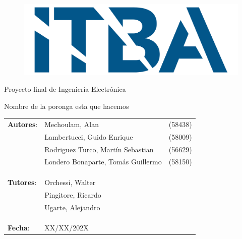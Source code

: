 \begin{titlepage}
\begin{figure}[H]
	\centering
	\includegraphics[width=0.5\linewidth]{./Utils/ITBA_2}
\end{figure}

\vspace*{1.5cm}

\center
{\Huge Proyecto final de Ingeniería Electrónica }

\vspace*{1cm}

{\LARGE \textcolor{PName}{Nombre de la poronga esta que hacemos} }

\vspace*{3cm}

\begin{tabular}{llr} 	
\textbf{Autores}: & Mechoulam, Alan  &  (58438)\\
 & Lambertucci, Guido Enrique  & (58009) \\
 & Rodriguez Turco, Martín Sebastian  & (56629) \\
 & Londero Bonaparte, Tomás Guillermo  & (58150) \\
 &  & \\
 &  & \\
 &  & \\
\textbf{Tutores}: & Orchessi, Walter & \hspace*{4cm} \\
 & Pingitore, Ricardo & \hspace*{4cm} \\
 & Ugarte, Alejandro & \hspace*{4cm} \\
 &  & \\
 &  & \\
 &  & \\
\textbf{Fecha}: & XX/XX/202X & \hspace*{4.5cm}\\
\end{tabular}

\end{titlepage}